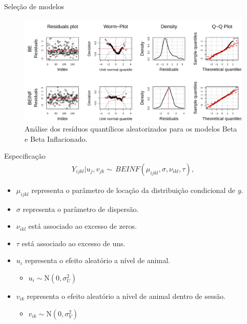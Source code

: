 \documentclass[
  ignorenonframetext,
  serif,
  professionalfont,
  usenames,
  dvipsnames,
  aspectratio = 169]{beamer}
\providecommand{\tightlist}{%
  \setlength{\itemsep}{0pt}\setlength{\parskip}{0pt}}
\renewcommand{\tightlist}{%
  \setlength{\itemsep}{0\baselineskip}
  \setlength{\parskip}{0.25\baselineskip}
}
\begin{document}
\begin{frame}{Seleção de modelos}
\protect\hypertarget{seleuxe7uxe3o-de-modelos-2}{}
\begin{figure}

{\centering \includegraphics[width=0.9\linewidth]{./img/mbetas} 

}

\caption{Análise dos resíduos quantílicos aleatorizados para os modelos Beta e Beta Inflacionado.}\label{fig:unnamed-chunk-13}
\end{figure}
\end{frame}

\begin{frame}{Especificação}
\protect\hypertarget{especificauxe7uxe3o-2}{}
\begin{equation}
    \begin{aligned}
        Y_{ijkl}|u_{j},v_{jk} \sim\,  BEINF(\mu_{ijkl}, \sigma, \nu_{ikl}, \tau),
    \end{aligned}
    \label{eq.model.geral}
\end{equation}

\begin{itemize}
\item
  \(\mu_{ijkl}\) representa o parâmetro de locação da distribuição
  condicional de \(y\).
\item
  \(\sigma\) representa o parâmetro de dispersão.
\item
  \(\nu_{ikl}\) está associado ao excesso de zeros.
\item
  \(\tau\) está associado ao excesso de uns.
\item
  \(u_{i}\) representa o efeito aleatório a nível de animal.

  \begin{itemize}
  \tightlist
  \item
    \(u_{i} \sim \text{N}(0, \sigma^{2}_{U})\)
  \end{itemize}
\item
  \(v_{ik}\) representa o efeito aleatório a nível de animal dentro de
  sessão.

  \begin{itemize}
  \tightlist
  \item
    \(v_{ik} \sim \text{N}(0, \sigma^{2}_{V})\)
  \end{itemize}
\end{itemize}
\end{frame}
\end{document}
